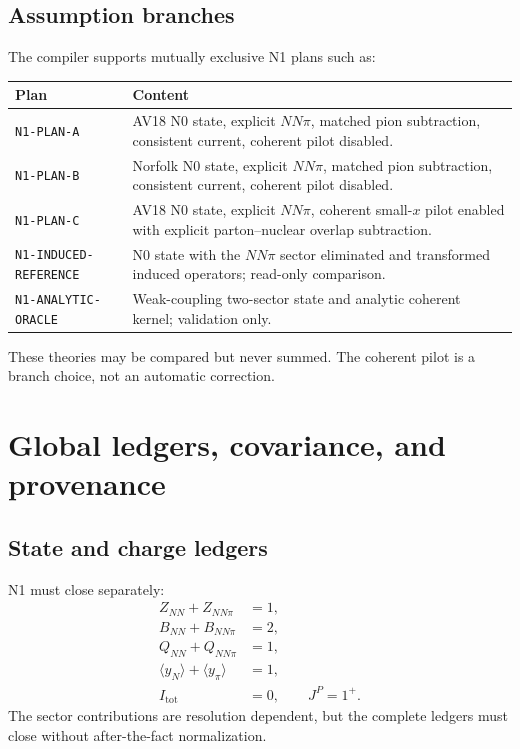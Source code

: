\documentclass[11pt]{article}
\begin{document}
\subsection{Assumption branches}

The compiler supports mutually exclusive N1 plans such as:
\begin{longtable}{L{0.30\textwidth}L{0.62\textwidth}}
\toprule
Plan & Content\\
\midrule
\endhead
\texttt{N1-PLAN-A} & AV18 N0 state, explicit \(NN\pi\), matched pion subtraction,
consistent current, coherent pilot disabled.\\
\texttt{N1-PLAN-B} & Norfolk N0 state, explicit \(NN\pi\), matched pion subtraction,
consistent current, coherent pilot disabled.\\
\texttt{N1-PLAN-C} & AV18 N0 state, explicit \(NN\pi\), coherent small-\(x\) pilot enabled
with explicit parton--nuclear overlap subtraction.\\
\texttt{N1-INDUCED-REFERENCE} & N0 state with the \(NN\pi\) sector eliminated and
transformed induced operators; read-only comparison.\\
\texttt{N1-ANALYTIC-ORACLE} & Weak-coupling two-sector state and analytic coherent
kernel; validation only.\\
\bottomrule
\end{longtable}
These theories may be compared but never summed.  The coherent pilot is a
branch choice, not an automatic correction.

\section{Global ledgers, covariance, and provenance}
\label{sec:ledgers}

\subsection{State and charge ledgers}

N1 must close separately:
\begin{align}
 Z_{NN}+Z_{NN\pi}&=1,
 \label{eq:ledger-prob}\\
 B_{NN}+B_{NN\pi}&=2,
 \label{eq:ledger-baryon}\\
 Q_{NN}+Q_{NN\pi}&=1,
 \label{eq:ledger-charge}\\
 \langle y_N\rangle+\langle y_\pi\rangle&=1,
 \label{eq:ledger-momentum}\\
 I_{\mathrm{tot}}&=0,
 \qquad
 J^P=1^+.
 \label{eq:ledger-quantum}
\end{align}
The sector contributions are resolution dependent, but the complete ledgers
must close without after-the-fact normalization.
\end{document}
